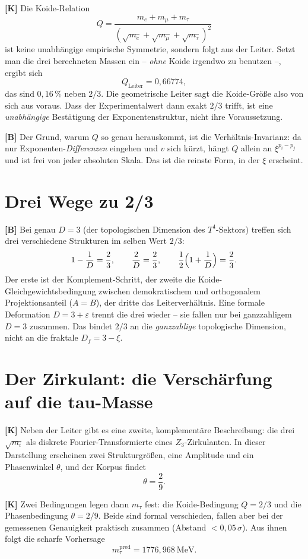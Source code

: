 \textbf{[K]} Die Koide-Relation
\[
  Q = \frac{m_e+m_\mu+m_\tau}{(\sqrt{m_e}+\sqrt{m_\mu}+\sqrt{m_\tau})^2}
\]
ist keine unabhängige empirische Symmetrie, sondern folgt aus der Leiter. Setzt
man die drei berechneten Massen ein -- \emph{ohne} Koide irgendwo zu benutzen --,
ergibt sich
\[
  Q_\text{Leiter} = 0{,}66774,
\]
das sind $0{,}16\,\%$ neben $2/3$. Die geometrische Leiter sagt die
Koide-Größe also von sich aus voraus. Dass der Experimentalwert dann exakt $2/3$
trifft, ist eine \emph{unabhängige} Bestätigung der Exponentenstruktur, nicht
ihre Voraussetzung.

\textbf{[B]} Der Grund, warum $Q$ so genau herauskommt, ist die
Verhältnis-Invarianz: da nur Exponenten-\emph{Differenzen} eingehen und $v$ sich
kürzt, hängt $Q$ allein an $\xi^{p_i-p_j}$ und ist frei von jeder absoluten
Skala. Das ist die reinste Form, in der $\xi$ erscheint.

\section{Drei Wege zu 2/3}

\textbf{[B]} Bei genau $D=3$ (der topologischen Dimension des $T^4$-Sektors)
treffen sich drei verschiedene Strukturen im selben Wert $2/3$:
\[
  1 - \frac1D = \frac23, \qquad \frac2D = \frac23, \qquad
  \frac12\Bigl(1+\frac1D\Bigr) = \frac23.
\]
Der erste ist der Komplement-Schritt, der zweite die Koide-Gleichgewichts\-be\-din\-gung
zwischen demokratischem und orthogonalem Projektionsanteil ($A=B$), der dritte
das Leiterverhältnis. Eine formale Deformation $D=3+\varepsilon$ trennt die drei
wieder -- sie fallen nur bei ganzzahligem $D=3$ zusammen. Das bindet $2/3$ an die
\emph{ganzzahlige} topologische Dimension, nicht an die fraktale $D_f=3-\xi$.

\section{Der Zirkulant: die Verschärfung auf die tau-Masse}

\textbf{[K]} Neben der Leiter gibt es eine zweite, komplementäre Beschreibung:
die drei $\sqrt{m_i}$ als diskrete Fourier-Transformierte eines
$Z_3$-Zirkulanten. In dieser Darstellung erscheinen zwei Strukturgrößen, eine
Amplitude und ein Phasenwinkel $\theta$, und der Korpus findet
\[
  \theta = \frac29.
\]

\textbf{[K]} Zwei Bedingungen legen dann $m_\tau$ fest: die Koide-Bedingung
$Q=2/3$ und die Phasenbedingung $\theta=2/9$. Beide sind formal verschieden,
fallen aber bei der gemessenen Genauigkeit praktisch zusammen (Abstand
$<0{,}05\,\sigma$). Aus ihnen folgt die scharfe Vorhersage
\[
  m_\tau^\text{pred} = 1776{,}968\ \text{MeV}.
\]

